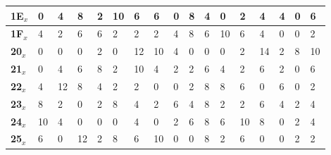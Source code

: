 \begin{longtable}[c]{|l|l|l|l|l|l|l|l|l|l|l|l|l|l|l|l|l|}
\textbf{1E$_x$} & 0              & 4              & 8              & 2              & 10             & 6              & 6              & 0              & 8              & 4              & 0              & 2              & 4              & 4              & 0              & 6              \\ \hline
\textbf{1F$_x$} & 4              & 2              & 6              & 6              & 2              & 2              & 2              & 4              & 8              & 6              & 10             & 6              & 4              & 0              & 0              & 2              \\ \hline
\textbf{20$_x$} & 0              & 0              & 0              & 2              & 0              & 12             & 10             & 4              & 0              & 0              & 0              & 2              & 14             & 2              & 8              & 10             \\ \hline
\textbf{21$_x$} & 0              & 4              & 6              & 8              & 2              & 10             & 4              & 2              & 2              & 6              & 4              & 2              & 6              & 2              & 0              & 6              \\ \hline
\textbf{22$_x$} & 4              & 12             & 8              & 4              & 2              & 2              & 0              & 0              & 2              & 8              & 8              & 6              & 0              & 6              & 0              & 2              \\ \hline
\textbf{23$_x$} & 8              & 2              & 0              & 2              & 8              & 4              & 2              & 6              & 4              & 8              & 2              & 2              & 6              & 4              & 2              & 4              \\ \hline
\textbf{24$_x$} & 10             & 4              & 0              & 0              & 0              & 4              & 0              & 2              & 6              & 8              & 6              & 10             & 8              & 0              & 2              & 4              \\ \hline
\textbf{25$_x$} & 6              & 0              & 12             & 2              & 8              & 6              & 10             & 0              & 0              & 8              & 2              & 6              & 0              & 0              & 2              & 2              \\ \hline

\end{longtable}
